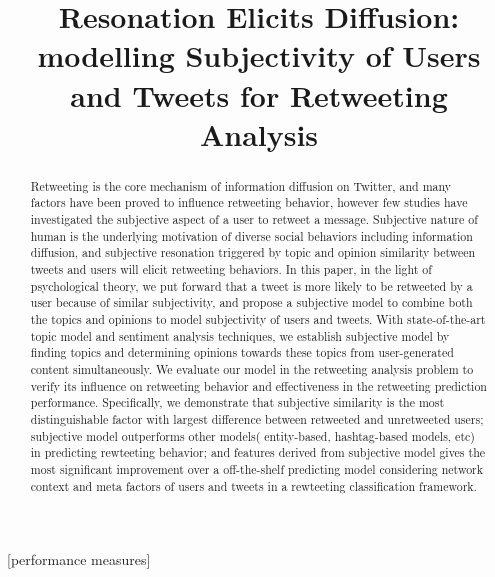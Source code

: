 \documentclass{acm_proc_article-sp}
\newcommand{\mo}[1]{\textcolor{red}{#1}}
\begin{document}
\title{Resonation Elicits Diffusion: modelling Subjectivity of Users and Tweets for Retweeting Analysis}

\maketitle
\begin{abstract}
Retweeting is the core mechanism of information diffusion on Twitter, and many factors have been proved to influence retweeting behavior, however few studies have investigated the subjective aspect of a user to retweet a message. 
Subjective nature of human is the underlying motivation of diverse social behaviors including information diffusion, and subjective resonation triggered by topic and opinion similarity between tweets and users will elicit retweeting behaviors.
In this paper, in the light of psychological theory, we put forward that a tweet is more likely to be retweeted by a user because of similar subjectivity, and propose a subjective model to combine both the topics and opinions to model subjectivity of users and tweets. 
With state-of-the-art topic model and sentiment analysis techniques, we establish subjective model by finding topics and determining opinions towards these topics from user-generated content simultaneously.
We evaluate our model in the retweeting analysis problem to verify its influence on retweeting behavior and effectiveness in the retweeting prediction performance. 
Specifically, we demonstrate that subjective similarity is the most distinguishable factor with largest difference between retweeted and unretweeted users;
subjective model outperforms other models( entity-based, hashtag-based models, etc) in predicting rewteeting behavior; 
and features derived from subjective model gives the most significant improvement over a off-the-shelf predicting model considering network context and meta factors of users and tweets in a rewteeting classification framework.
\end{abstract}
[performance measures]
\end{document}
